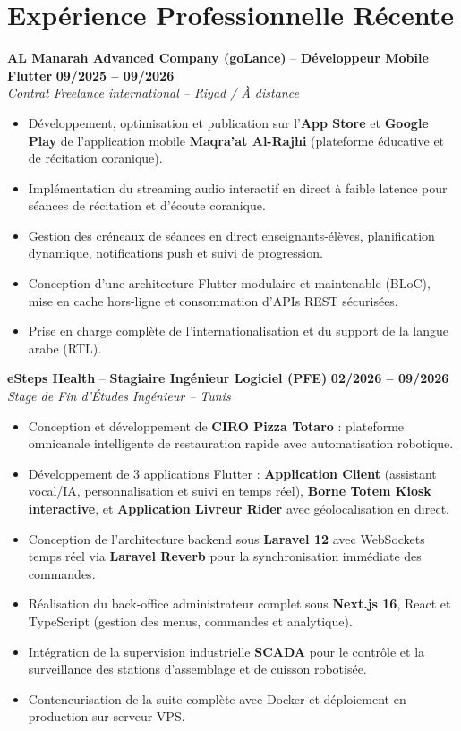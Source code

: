 \documentclass[10pt,a4paper]{article}
\newcommand{\role}[4]{
  \vspace{3pt}
  \textbf{\color{primarydark}#1} -- \textbf{#2} \hfill {\color{textgray}\textbf{#3}}\\
  {\color{subgray}\textit{#4}}\vspace{1pt}
}
\begin{document}
\vspace{3pt}
\section{Expérience Professionnelle Récente}

\role{AL Manarah Advanced Company (goLance)}{Développeur Mobile Flutter}{09/2025 -- 09/2026}{Contrat Freelance international -- Riyad / À distance}
\begin{itemize}
  \item Développement, optimisation et publication sur l'\textbf{App Store} et \textbf{Google Play} de l'application mobile \textbf{Maqra'at Al-Rajhi} (plateforme éducative et de récitation coranique).
  \item Implémentation du streaming audio interactif en direct à faible latence pour séances de récitation et d'écoute coranique.
  \item Gestion des créneaux de séances en direct enseignants-élèves, planification dynamique, notifications push et suivi de progression.
  \item Conception d'une architecture Flutter modulaire et maintenable (BLoC), mise en cache hors-ligne et consommation d'APIs REST sécurisées.
  \item Prise en charge complète de l'internationalisation et du support de la langue arabe (RTL).
\end{itemize}

\role{eSteps Health}{Stagiaire Ingénieur Logiciel (PFE)}{02/2026 -- 09/2026}{Stage de Fin d'Études Ingénieur -- Tunis}
\begin{itemize}
  \item Conception et développement de \textbf{CIRO Pizza Totaro} : plateforme omnicanale intelligente de restauration rapide avec automatisation robotique.
  \item Développement de 3 applications Flutter : \textbf{Application Client} (assistant vocal/IA, personnalisation et suivi en temps réel), \textbf{Borne Totem Kiosk interactive}, et \textbf{Application Livreur Rider} avec géolocalisation en direct.
  \item Conception de l'architecture backend sous \textbf{Laravel 12} avec WebSockets temps réel via \textbf{Laravel Reverb} pour la synchronisation immédiate des commandes.
  \item Réalisation du back-office administrateur complet sous \textbf{Next.js 16}, React et TypeScript (gestion des menus, commandes et analytique).
  \item Intégration de la supervision industrielle \textbf{SCADA} pour le contrôle et la surveillance des stations d'assemblage et de cuisson robotisée.
  \item Conteneurisation de la suite complète avec Docker et déploiement en production sur serveur VPS.
\end{itemize}
\end{document}

